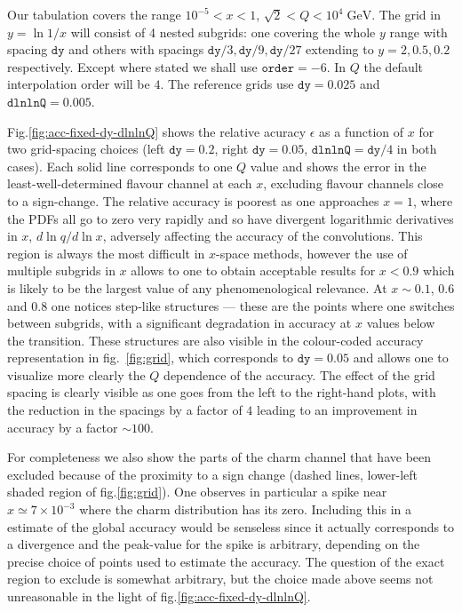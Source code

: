 \documentclass[12pt]{article}
\newcommand{\dy}{\ttt{dy}}
\newcommand{\dlnlnQ}{\ttt{dlnlnQ}}
\newcommand{\GeV}{\;\mathrm{GeV}}
\newcommand{\ttt}[1]{\texttt{#1}}
\begin{document}
Our tabulation covers the range $10^{-5}<x<1$, $\sqrt{2} < Q<
10^4\GeV$. The grid in $y=\ln1/x$ will consist of 4 nested subgrids:
one covering the whole $y$ range with spacing $\ttt{dy}$ and others
with spacings $\ttt{dy}/3, \ttt{dy}/9, \ttt{dy}/27$ extending to
$y=2,0.5,0.2$ respectively. Except where stated we shall use
$\ttt{order}=-6$. In $Q$ the default interpolation order will be $4$.
The reference grids use $\dy=0.025$ and $\dlnlnQ=0.005$.

Fig.\ref{fig:acc-fixed-dy-dlnlnQ} shows the relative acuracy
$\epsilon$ as a function of $x$ for two grid-spacing choices (left
$\dy=0.2$, right $\dy=0.05$, $\dlnlnQ=\dy/4$ in both cases). Each
solid line corresponds to one $Q$ value and shows the error in the
least-well-determined flavour channel at each $x$, excluding flavour
channels close to a sign-change. The relative accuracy is poorest as
one approaches $x=1$, where the PDFs all go to zero very rapidly and
so have divergent logarithmic derivatives in $x$, $d\ln q/d\ln x$,
adversely affecting the accuracy of the convolutions. This region is
always the most difficult in $x$-space methods, however the use of
multiple subgrids in $x$ allows to one to obtain acceptable results
for $x<0.9$ which is likely to be the largest value of any
phenomenological relevance. At $x\sim0.1$, $0.6$ and $0.8$ one notices
step-like structures --- these are the points where one switches
between subgrids, with a significant degradation in accuracy at $x$
values below the transition. These structures are also visible in the
colour-coded accuracy representation in fig.~\ref{fig:grid}, which
corresponds to $\dy=0.05$ and allows one to visualize more clearly the
$Q$ dependence of the accuracy. The effect of the grid spacing is
clearly visible as one goes from the left to the right-hand plots,
with the reduction in the spacings by a factor of $4$ leading to an
improvement in accuracy by a factor $\sim 100$.



For completeness we also show the parts of the charm channel that have
been excluded because of the proximity to a sign change (dashed lines,
lower-left shaded region of fig.\ref{fig:grid}).  One observes in
particular a spike near $x\simeq 7 \times 10^{-3}$ where the charm
distribution has its zero. Including this in a estimate of the global
accuracy would be senseless since it actually corresponds to a
divergence and the peak-value for the spike is arbitrary, depending on
the precise choice of points used to estimate the accuracy. The
question of the exact region to exclude is somewhat arbitrary, but the
choice made above seems not unreasonable in the light of
fig.\ref{fig:acc-fixed-dy-dlnlnQ}.
\end{document}
